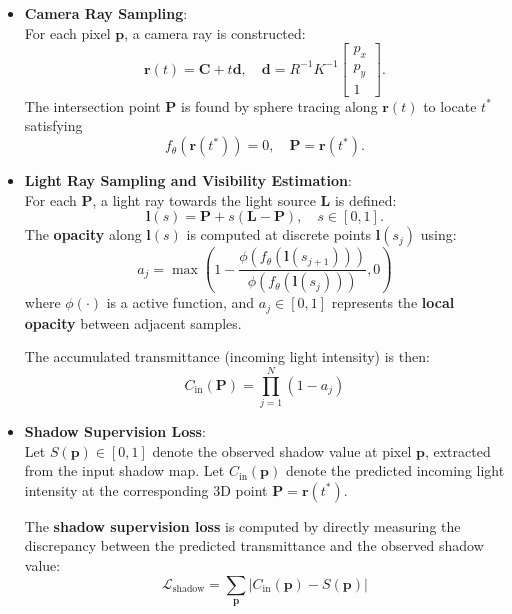 \documentclass[12pt]{article}
\theoremstyle{definition}
\begin{document}
\begin{itemize}

    \item \textbf{Camera Ray Sampling}: \\
    For each pixel $\mathbf{p}$, a camera ray is constructed:
    \[
    \mathbf{r}(t) = \mathbf{C} + t \mathbf{d}, \quad \mathbf{d} = R^{-1} K^{-1} \begin{bmatrix} p_x \\ p_y \\ 1 \end{bmatrix}.
    \]
    The intersection point $\mathbf{P}$ is found by sphere tracing along $\mathbf{r}(t)$ to locate $t^*$ satisfying
    \[
    f_\theta(\mathbf{r}(t^*)) = 0, \quad \mathbf{P} = \mathbf{r}(t^*).
    \]

    \item \textbf{Light Ray Sampling and Visibility Estimation}: \\
    For each $\mathbf{P}$, a light ray towards the light source $\mathbf{L}$ is defined:
    \[
    \mathbf{l}(s) = \mathbf{P} + s (\mathbf{L} - \mathbf{P}), \quad s \in [0, 1].
    \]
    The \textbf{opacity} along $\mathbf{l}(s)$ is computed at discrete points $\mathbf{l}(s_j)$ using:
    \[
    a_j = \max\left( 1 - \frac{ \phi(f_\theta(\mathbf{l}(s_{j+1})) ) }{ \phi(f_\theta(\mathbf{l}(s_j))) }, 0 \right)
    \]
    where $\phi(\cdot)$ is a active function, and $a_j \in [0,1]$ represents the \textbf{local opacity} between adjacent samples.

    The accumulated transmittance (incoming light intensity) is then:
    \[
    C_{\mathrm{in}}(\mathbf{P}) = \prod_{j=1}^N (1 - a_j)
    \]

    \item \textbf{Shadow Supervision Loss}: \\
    Let $S(\mathbf{p}) \in [0,1]$ denote the observed shadow value at pixel $\mathbf{p}$, extracted from the input shadow map. Let $C_{\mathrm{in}}(\mathbf{p})$ denote the predicted incoming light intensity at the corresponding 3D point $\mathbf{P} = \mathbf{r}(t^*)$.

    The \textbf{shadow supervision loss} is computed by directly measuring the discrepancy between the predicted transmittance and the observed shadow value:
    \[
    \mathcal{L}_{\mathrm{shadow}} = \sum_{\mathbf{p}} \left| C_{\mathrm{in}}(\mathbf{p}) - S(\mathbf{p}) \right|
    \]

\end{itemize}
\end{document}
